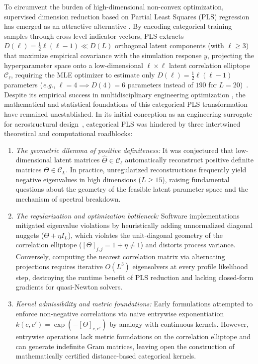 \documentclass[default,sn-mathphys,Numbered]{sn-jnl}
\theoremstyle{thmstyleone}
\theoremstyle{thmstylethree}
\theoremstyle{thmstyletwo}
\begin{document}
To circumvent the burden of high-dimensional non-convex optimization, supervised dimension reduction based on Partial Least Squares (PLS) regression \citep{wold_1975,hellandStructurePartialLeast1988,bouhlel_KPLSK,Bouhlel18} has emerged as an attractive alternative \citep{saves2023high,saves2023smt,zuhal2021dimensionality,PLS-based}. By encoding categorical training samples through cross-level indicator vectors, PLS extracts $D(\ell) = \frac{1}{2}\ell(\ell-1) \ll D(L)$ orthogonal latent components (with $\ell \ge 3$) that maximize empirical covariance with the simulation response $y$, projecting the hyperparameter space onto a low-dimensional $\ell \times \ell$ latent correlation elliptope $\mathcal{C}_\ell$, requiring the MLE optimizer to estimate only $D(\ell) = \frac{1}{2}\ell(\ell-1)$ parameters (\textit{e.g.}, $\ell = 4 \implies D(4) = 6$ parameters instead of $190$ for $L=20$)~\citep{saves2023high}.
Despite its empirical success in multidisciplinary engineering optimization \citep{saves2023high,Mixed_Paul}, the mathematical and statistical foundations of this categorical PLS transformation have remained unestablished. In its initial conception as an engineering surrogate for aerostructural design~\citep{saves2023high}, categorical PLS was hindered by three intertwined theoretical and computational roadblocks:
\begin{enumerate}
    \item[(i)] \textit{The geometric dilemma of positive definiteness:} It was conjectured that low-dimensional latent matrices $\hat{\Theta} \in \mathcal{C}_\ell$ automatically reconstruct positive definite matrices $\Theta \in \mathcal{C}_L$. In practice, unregularized reconstructions frequently yield negative eigenvalues in high dimensions ($L \ge 15$), raising fundamental questions about the geometry of the feasible latent parameter space and the mechanism of spectral breakdown.
    \item[(ii)] \textit{The regularization and optimization bottleneck:} Software implementations \citep{saves2023smt} mitigated eigenvalue violations by heuristically adding unnormalized diagonal nuggets ($\Theta + \eta I_L$), which violates the unit-diagonal geometry of the correlation elliptope ($[\Theta]_{j, j} = 1 + \eta \neq 1$) and distorts process variance. Conversely, computing the nearest correlation matrix via alternating projections \citep{higham2002computing} requires iterative $O(L^3)$ eigensolvers at every profile likelihood step, destroying the runtime benefit of PLS reduction and lacking closed-form gradients for quasi-Newton solvers.
    \item[(iii)] \textit{Kernel admissibility and metric foundations:} Early formulations attempted to enforce non-negative correlations via naive entrywise exponentiation $k(c, c') = \exp(-[\Theta]_{c, c'})$ by analogy with continuous kernels. However, entrywise operations lack metric foundations on the correlation elliptope and can generate indefinite Gram matrices, leaving open the construction of mathematically certified distance-based categorical kernels.
\end{enumerate}
\end{document}
